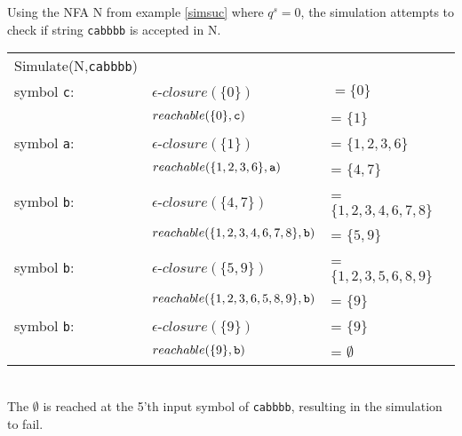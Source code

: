 \begin{myex}
Using the NFA N from example \ref{simsuc} where $q^s=0$, the simulation attempts to check if string {\tt cabbbb} is accepted in N.\\
\begin{tabular}{l l l}
Simulate(N,{\tt cabbbb}) & & \\
symbol {\tt c}: & $\epsilon$-$closure(\{0\})$ &$ = \{0\}$\\
&$reachable(\{0\},{\tt c})$& = $\{1\}$\\
symbol {\tt a}: & $\epsilon$-$closure(\{1\})$& = $\{1,2,3,6\}$\\
&$reachable(\{1,2,3,6\},{\tt a})$ & = $\{4,7\}$\\
symbol {\tt b}: & $\epsilon$-$closure(\{4,7\})$& = $\{1,2,3,4,6,7,8\}$\\
&$reachable(\{1,2,3,4,6,7,8\},{\tt b})$ &= $\{5,9\}$\\
symbol {\tt b}: & $\epsilon$-$closure(\{5,9\})$& = $\{1,2,3,5,6,8,9\}$\\
&$reachable(\{1,2,3,6,5,8,9\},{\tt b})$ &= $\{9\}$\\
symbol {\tt b}: & $\epsilon$-$closure(\{9\})$& = $\{9\}$\\
&$reachable(\{9\},{\tt b})$ &= $\emptyset$\\
\end{tabular}\\
The $\emptyset$ is reached at the 5'th input symbol of {\tt cabbbb}, resulting in the simulation to fail. 
\end{myex}